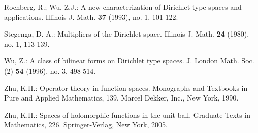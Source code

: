 \documentclass[12pt,twoside,leqno,final]{amsart}
\theoremstyle{plain}
\begin{document}
\begin{thebibliography}{12}
 Rochberg, R.; Wu, Z.J.:
 A new characterization of Dirichlet type spaces and applications. 
Illinois J. Math. \textbf{37} (1993), no. 1, 101-122. 

 Stegenga, D. A.:
Multipliers of the Dirichlet space. 
Illinois J. Math. \textbf{24} (1980), no. 1, 113-139. 

 Wu, Z.:
 A class of bilinear forms on Dirichlet type spaces.
 J. London Math. Soc. (2) \textbf{54} (1996), no. 3, 498-514. 

  Zhu, K.H.: 
Operator theory in function spaces. 
Monographs and Textbooks in Pure and Applied Mathematics, 139. 
Marcel Dekker, Inc., New York, 1990.

  Zhu, K.H.: 
Spaces of holomorphic functions in the unit ball. 
Graduate Texts in Mathematics, 226. 
Springer-Verlag, New York, 2005.

 \end{thebibliography}
\end{document}
